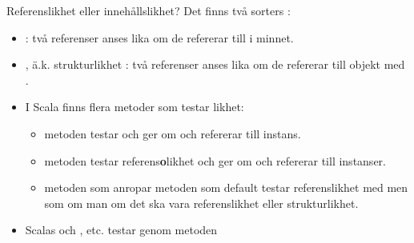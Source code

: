 


\begin{Slide}{Referenslikhet eller innehållslikhet?}\SlideFontSmall
Det finns två  sorters :
\begin{itemize}
\item {} : två referenser anses lika om de refererar till  i minnet.
\item {}, ä.k. strukturlikhet : två referenser anses lika om de refererar till objekt med .

\pause

\item I Scala finns flera metoder som testar likhet:
\begin{itemize}\SlideFontSmall
\item metoden  testar  och  ger  om  och  refererar till  instans.

\item metoden  testar referens\textbf{o}likhet och  ger  om  och  refererar till  instanser.

\item metoden \code{==} som anropar metoden  som default testar referenslikhet med  men som  om man  om det ska vara referenslikhet eller strukturlikhet.
\end{itemize}

\pause

\item Scalas  och  ,  etc. testar  genom metoden \code{==}
\end{itemize}
\end{Slide}


